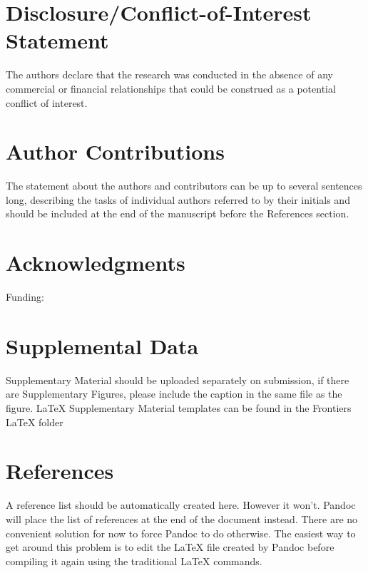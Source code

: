 \documentclass[utf8]{frontiersSCNS}
\begin{document}
\hypertarget{disclosureconflict-of-interest-statement}{%
\section*{Disclosure/Conflict-of-Interest
Statement}\label{disclosureconflict-of-interest-statement}}

The authors declare that the research was conducted in the absence of
any commercial or financial relationships that could be construed as a
potential conflict of interest.

\hypertarget{author-contributions}{%
\section*{Author Contributions}\label{author-contributions}}

The statement about the authors and contributors can be up to several
sentences long, describing the tasks of individual authors referred to
by their initials and should be included at the end of the manuscript
before the References section.

\hypertarget{acknowledgments}{%
\section*{Acknowledgments}\label{acknowledgments}}

Funding:

\hypertarget{supplemental-data}{%
\section{Supplemental Data}\label{supplemental-data}}

Supplementary Material should be uploaded separately on submission, if
there are Supplementary Figures, please include the caption in the same
file as the figure. LaTeX Supplementary Material templates can be found
in the Frontiers LaTeX folder

\hypertarget{references}{%
\section{References}\label{references}}

A reference list should be automatically created here. However it won't.
Pandoc will place the list of references at the end of the document
instead. There are no convenient solution for now to force Pandoc to do
otherwise. The easiest way to get around this problem is to edit the
LaTeX file created by Pandoc before compiling it again using the
traditional LaTeX commands.
\end{document}
